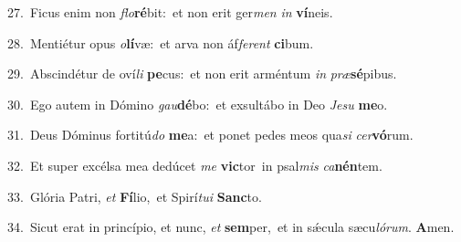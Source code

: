 {\numbfont\textcolor{\numbcolor}{27.}}~Ficus enim non \textit{flo}\-\textbf{ré}bit:~\star et non erit ger\textit{men} \textit{in} \textbf{ví}\-neis.\par
{\numbfont\textcolor{\numbcolor}{28.}}~Mentiétur opus \textit{o}\-\textbf{lí}væ:~\star et arva non áf\-\textit{fe}\-\textit{rent} \textbf{ci}\-bum.\par
{\numbfont\textcolor{\numbcolor}{29.}}~Abscindétur de oví\textit{li} \textbf{pe}\-cus:~\star et non erit arméntum \textit{in} \textit{præ}\-\textbf{sé}pibus.\par
{\numbfont\textcolor{\numbcolor}{30.}}~Ego autem in Dómino \textit{gau}\-\textbf{dé}bo:~\star et exsultábo in Deo \textit{Je}\-\textit{su} \textbf{me}\-o.\par
{\numbfont\textcolor{\numbcolor}{31.}}~Deus Dóminus fortitú\textit{do} \textbf{me}\-a:~\star et ponet pedes meos qua\textit{si} \textit{cer}\-\textbf{vó}rum.\par
{\numbfont\textcolor{\numbcolor}{32.}}~Et super excélsa mea dedúcet \textit{me} \textbf{vic}\-tor~\star in psal\textit{mis} \textit{ca}\-\textbf{nén}tem.\par
{\numbfont\textcolor{\numbcolor}{33.}}~Glória Patri, \textit{et} \textbf{Fí}\-lio,~\star et Spirí\-\textit{tu}\-\textit{i} \textbf{Sanc}\-to.\par
{\numbfont\textcolor{\numbcolor}{34.}}~Sicut erat in princípio, et nunc, \textit{et} \textbf{sem}\-per,~\star et in sǽcula sæcu\-\textit{ló}\-\textit{rum}. \textbf{A}\-men.\par
